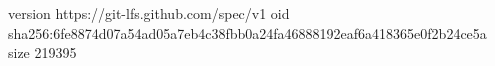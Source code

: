 version https://git-lfs.github.com/spec/v1
oid sha256:6fe8874d07a54ad05a7eb4c38fbb0a24fa46888192eaf6a418365e0f2b24ce5a
size 219395
